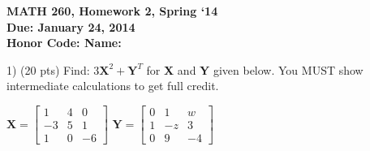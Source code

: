 \documentclass{article}
\begin{document}
\begin{flushleft}
	\bfseries{MATH 260, Homework 2, Spring `14}\\
	\bfseries{Due: January 24, 2014}\\
	\bfseries{Honor Code:} \hspace{3.5in}\bfseries{Name:}\\
\end{flushleft}
\begin{flushleft}
\vspace{.25in}

1) (20 pts) Find: $3\textbf{X}^{2} + \textbf{Y}^{T}$ for \textbf{X} and \textbf{Y} given below.  You MUST show intermediate calculations to get full credit.

\vspace{0.2in}

\begin{center}

$\textbf{X}=\left[
\begin{array}{ccc}
1 & 4 & 0\\
-3 & 5 & 1\\
1 & 0 & -6
\end{array}
\right]
$
\hspace{0.1in}
$\textbf{Y}=\left[
\begin{array}{ccc}
0 & 1 & w\\
1 & -z & 3\\
0 & 9 & -4
\end{array}
\right]
$

\end{center}

\end{flushleft}
\end{document}
